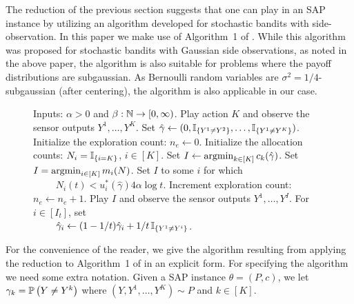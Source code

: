 \newcommand{\set}{\leftarrow}
\newcommand{\hgamma}{\hat{\gamma}}
The reduction of the previous section suggests that one can play in an SAP instance by utilizing 
an algorithm developed for stochastic bandits with side-observation.
In this paper we make use of Algorithm~1 of \citet{WGySz:NIPS15}. 
While this algorithm was proposed for stochastic bandits with Gaussian side observations, 
as noted in the above paper, the algorithm is also suitable for problems where the payoff distributions are subgaussian.
As Bernoulli random variables are $\sigma^2=1/4$-subgaussian (after centering),
the algorithm is also applicable in our case.

\begin{wrapfigure}{L}{0.55\textwidth}
\vspace{-0.4cm}
\begin{minipage}{0.54\textwidth}
\begin{algorithm}[H]
\caption{} %
\label{alg:asym}
\begin{algorithmic}[1]
\STATE Inputs: $\alpha>0$ and $\beta: \mathbb{N} \to [0,\infty)$.
\STATE Play action $K$ and observe the sensor outputs $Y^1,\dots,Y^K$.
\STATE Set $\hgamma \set (0,\one{Y^1\ne Y^2},\dots,\one{Y^1\ne Y^K})$.
\STATE Initialize the exploration count: $n_e \set 0$.
\STATE Initialize the allocation counts: $N_i = \mathbb{I}_{\{i=K\}}$, $i\in [K]$.
	\IF{$\frac{N}{4\alpha \log t}\in C(\hgamma)$} \label{alg:check}
		\STATE Set $I \set \argmin_{k\in [K]} c_k(\hgamma)$. \label{alg:greedy}
	\ELSE
		 \label{alg:starve}
			\STATE Set $I = \operatorname{argmin}_{i\in [K]}m_i(N)$. \label{alg:forced}
		\ELSE
			\STATE Set $I$ to some $i$ for which \label{alg:plan} \\
			$\qquad$ $N_i(t)< u_i^*(\hgamma)4\alpha\log t$.
		\ENDIF
		\STATE Increment exploration count: $n_e \set n_e+1$.
	\ENDIF
	\STATE Play $I$ and observe the sensor outputs $Y^1,\dots,Y^{I}$.
	\STATE For $i\in [I_t]$, set\\
	$\qquad$ $\hgamma_i \set (1-1/t) \hgamma_i + 1/t \,\one{Y^1\ne Y^i}$.
\ENDFOR
\end{algorithmic}
\end{algorithm}
\end{minipage}
\vspace{-0.3cm}
\end{wrapfigure}

For the convenience of the reader, we give the algorithm resulting from applying the reduction to Algorithm~1 
of \citet{WGySz:NIPS15} in an explicit form.
For specifying the algorithm we need some extra notation.
Given a SAP instance $\theta = (P,c)$, we let $\gamma_k = \mathbb{P}\left(Y\ne Y^k\right)$ where $(Y,Y^1,\dots,Y^K)\sim P$ and $k\in [K]$.

